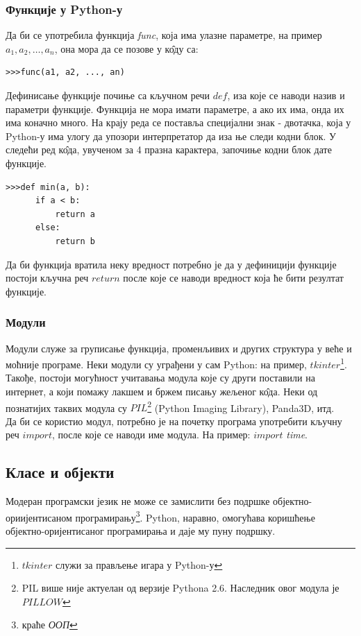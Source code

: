 \documentclass[11pt, serbianc, english, titlepage]{article}
\begin{document}
		\subsubsection{Функције у Python-у}
		Да би се употребила функција \emph{func}, која има улазне параметре, на пример $a_{1}, a_{2},\dots, a_{n}$, она мора да се позове у к\^{о}ду са:
		\begin{lstlisting}
>>>func(a1, a2, ..., an)
		\end{lstlisting}  
		Дефинисање функције почиње са кључном речи $def$, иза које се наводи назив и параметри функције. Функција не мора имати параметре, а ако их има, онда их има коначно много. На крају реда се поставља специјални знак - двотачка, која у Python-у има улогу да упозори интерпретатор да иза ње следи кодни блок. У следећи ред к\^{о}да, увученом за 4 празна карактера, започиње кодни блок дате функције. 
		\begin{lstlisting}[caption = Дефинисање функције, label = func]
>>>def min(a, b):
      if a < b:
          return a
      else:
          return b
		\end{lstlisting}
		Да би функција вратила неку вредност потребно је да у дефиницији функције постоји кључна реч $return$ после које се наводи вредност која ће бити резултат функције. 
		\subsubsection{Модули}
		Модули служе за груписање функција, променљивих и других структура у веће и моћније програме. Неки модули су уграђени у сам Python: на пример, $tkinter$\footnote{$tkinter$ служи за прављење игара у Python-у}. Такође, постоји могућност учитавања модула које су други поставили на интернет, а који помажу лакшем и бржем писању жељеног к\^{о}да. Неки од познатијих таквих модула су $PIL$\footnote{PIL више није актуелан од верзије Pythona 2.6. Наследник овог модула је $PILLOW$}  (Python Imaging Library), Panda3D, итд.\\
		 Да би се користио модул, потребно је на почетку програма употребити кључну реч $import$, после које се наводи име модула. На пример: $import$ \emph{time}.
		\subsection{Класе и објекти}
		Модеран програмски језик не може се замислити без подршке објектно-ориијентисаном програмирању\footnote{краће \emph{ООП}}. Python, наравно, омогућава коришћење објектно-оријентисаног програмирања и даје му пуну подршку.  
\end{document}
